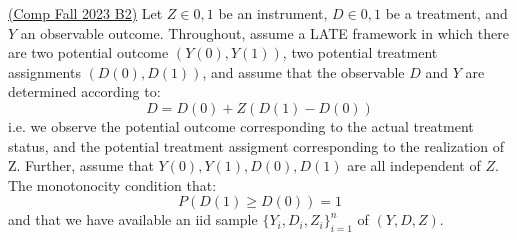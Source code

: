 \documentclass[answers]{exam}
\begin{document}
\begin{questions}


        \question \href{https://economics.ucla.edu/wp-content/uploads/2023/09/comp-fall-2023-part1-2-3_c.pdf#page=6}{(Comp Fall 2023 B2)}
        Let $Z \in {0,1}$ be an instrument, $D \in {0,1}$ be a treatment, and $Y$ an observable outcome. Throughout, assume a LATE framework in which there are two potential outcome $(Y(0), Y(1))$, two potential treatment assignments $(D(0), D(1))$, and assume that the observable $D$ and $Y$ are determined according to:
        $$D = D(0) + Z(D(1)-D(0))$$
        i.e. we observe the potential outcome corresponding to the actual treatment status, and the potential treatment assigment corresponding to the realization of Z. Further, assume that $Y(0), Y(1), D(0), D(1)$ are all independent of $Z$. The monotonocity condition that:
        $$P(D(1)\geq D(0))=1$$
        and that we have available an iid sample $\{Y_i, D_i, Z_i\}_{i=1}^n$ of $(Y,D ,Z)$.
\end{questions}
\end{document}
